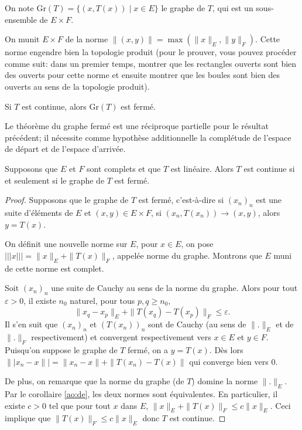 \begin{df}
  On note $\mathrm{Gr}(T) = \{(x, T(x))\mid x\in E\}$ le graphe
  de $T$, qui est un sous-ensemble de $E\times F$.
\end{df}

On munit $E\times F$ de la norme $\|(x, y)\| = \max (\|x\|_E, \|y\|_F)$.
Cette norme engendre bien la topologie produit (pour le prouver, vous
pouvez procéder comme suit: dans un premier temps, montrer que les rectangles
ouverts sont bien des ouverts pour cette norme et ensuite montrer que
les boules sont bien des ouverts au sens de la topologie produit).

\begin{exo}
  Si $T$ est continue, alors $\mathrm{Gr}(T)$ est fermé.
\end{exo}

Le théorème du graphe fermé est une réciproque partielle
pour le résultat précédent; il nécessite comme hypothèse additionnelle
la complétude de l'espace de départ et de l'espace d'arrivée.

\begin{thm}
  Supposons que $E$ et $F$ sont complets et que $T$ est linéaire.
  Alors $T$ est continue si et seulement si le graphe de $T$ est
  fermé.
\end{thm}

\begin{proof}
  Supposons que le graphe de $T$ est fermé, c'est-à-dire si
  $(x_n)_n$ est une suite d'éléments de $E$ et
  $(x, y)\in E\times F$, si $(x_n, T(x_n))\to (x, y)$, alors
  $y = T(x)$.

  On définit une nouvelle norme sur $E$, pour $x\in E$, on
  pose $|\!|\!|x |\!|\!|= \|x\|_E + \|T(x)\|_F$, appelée norme du graphe.
  Montrons que $E$ muni de cette norme est complet.

  Soit $(x_n)_n$ une suite de Cauchy au sens de la norme du graphe.
  Alors pour tout $\varepsilon >0$, il existe $n_0$ naturel,
  pour tous $p, q\geq n_0$,
  $$\|x_q-x_p\|_E + \|T(x_q)-T(x_p)\|_F\leq \varepsilon.$$
  Il s'en suit que $(x_n)_n$ et $(T(x_n))_n$ sont de Cauchy (au
  sens de $\|.\|_E$ et de $ \|.\|_F$ respectivement) et convergent
  respectivement vers $x\in E$ et $y\in F$.
  Puisqu'on suppose le graphe de $T$ fermé, on a $y = T(x)$.
  Dès lors $\||x_n -x \|| = \|x_n - x\| + \|T(x_n)-T(x)\|$
  qui converge bien vers $0$.

  De plus, on remarque que la norme du graphe (de $T$)
  domine la norme $\|.\|_E$. Par le corollaire \ref{ao:de},
  les deux normes sont équivalentes. En particulier,
  il existe $c > 0$ tel que pour tout $x$ dans $E$,
  $\|x\|_E + \|T(x)\|_F\leq c\|x\|_E$. Ceci implique
  que $\|T(x)\|_F\leq c\|x\|_E$ donc $T$ est continue.
\end{proof}


